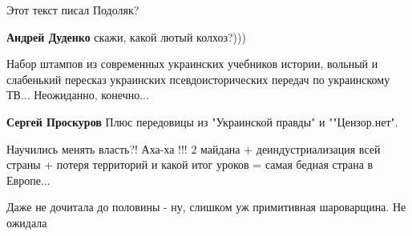 \begin{itemize}
 
Этот текст писал Подоляк?

\begin{itemize}
 
\textbf{Андрей Дуденко} скажи, какой лютый колхоз?)))
\end{itemize}

 

Набор штампов из современных украинских учебников истории, вольный и слабенький
пересказ украинских псевдоисторических передач по украинскому ТВ... Неожиданно,
конечно...

\begin{itemize}
 
\textbf{Сергей Проскуров} Плюс передовицы из "Украинской правды" и ""Цензор.нет".
\end{itemize}

 
Научились менять власть?! Аха-ха !!! 2 майдана + деиндустриализация всей страны + потеря территорий и какой итог уроков = самая бедная страна в Европе...

 
Даже не дочитала до половины - ну, слишком уж примитивная шароварщина. Не ожидала


\end{itemize}
